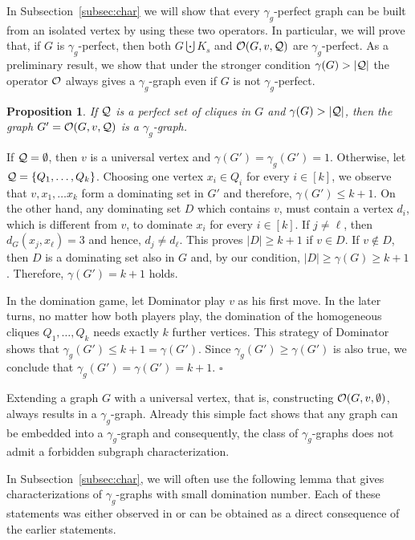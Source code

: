 \documentclass[12pt]{article}
\newtheorem{proposition}[theorem]{Proposition}
\newcommand{\proof}{\noindent{\bf Proof.\ }}
\newcommand{\qed}{\hfill $\square$ \bigskip}
\newcommand{\cO}{{\cal O}}
\newcommand{\cQ}{{\cal Q}}
\begin{document}
In Subsection~\ref{subsec:char} we will show that every $\gamma_g$-perfect graph can be built from an isolated vertex by using these two operators. In particular, we will prove that, if $G$ is $\gamma_g$-perfect, then both  $G \bigcupdot  K_s$ and $\cO(G, v, \cQ)$ are $\gamma_g$-perfect.
As a preliminary result, we show that under the stronger condition $\gamma(G) >|\cQ|$ the operator $\cO$ always gives a $\gamma_g$-graph even if $G$ is not $\gamma_g$-perfect.

\begin{proposition}
	\label{prop:opO}
 If $\cQ$ is a perfect set of cliques in $G$ and $\gamma(G) >|\cQ|$, then the graph $G'=\cO(G, v, \cQ)$ is a $\gamma_g$-graph.
  \end{proposition}
\proof If $\cQ=\emptyset$, then $v$ is a universal vertex  and $\gamma(G')=\gamma_g(G')=1$. Otherwise, let $\cQ=\{Q_1, \dots ,Q_k\}$. Choosing one vertex $x_i\in Q_i$ for every $i \in [k]$, we observe that $v,x_1,\dots x_k$ form a dominating set in $G'$ and therefore, $\gamma(G')\le k+1$. On the other hand, any dominating set $D$ which contains $v$, must contain a vertex $d_i$, which is different from $v$, to dominate $x_i$ for every $i\in [k]$. If $j\neq \ell$, then $d_G(x_j, x_\ell) = 3$ and hence, $d_j\neq d_\ell$. This proves $|D| \ge k+1$ if $v\in D$. If $v\notin D$, then $D$ is a dominating set also in $G$ and, by our condition, $|D|\ge \gamma(G) \ge k+1$. Therefore, $\gamma(G')=k+1$ holds.

In the domination game, let Dominator play $v$ as his first move. In the later turns, no matter how both players play, the domination of the homogeneous cliques $Q_1,\dots,Q_k$ needs exactly $k$ further vertices.  This strategy of Dominator shows that $\gamma_g(G')\le k+1=\gamma(G')$. Since $\gamma_g(G')\ge \gamma(G')$ is also true, we conclude that $\gamma_g(G')= \gamma(G')=k+1$. \qed

Extending a graph $G$ with a universal vertex, that is, constructing $\cO(G,v, \emptyset)$, always results in a $\gamma_g$-graph. Already this simple fact shows that any graph can be embedded into a $\gamma_g$-graph and consequently, the class of $\gamma_g$-graphs does not admit a forbidden subgraph characterization.  

In Subsection~\ref{subsec:char}, we will often use the following lemma that gives characterizations of   $\gamma_g$-graphs with small domination number. Each of these statements was either observed in \cite{KKS-2016} or can be obtained as a direct consequence of the earlier statements. 
\end{document}
